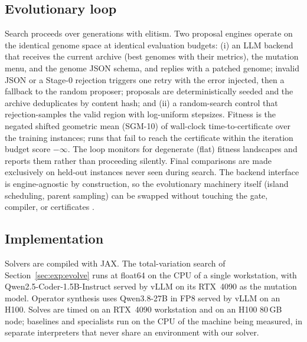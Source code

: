 \subsection{Evolutionary loop}

Search proceeds over generations with elitism. Two proposal engines operate
on the identical genome space at identical evaluation budgets: (i) an
LLM backend that receives the current archive (best genomes with their
metrics), the mutation menu, and the genome JSON schema, and replies with a
patched genome; invalid JSON or a Stage-0 rejection triggers one retry
with the error injected, then a fallback to the random proposer; proposals
are deterministically seeded and the archive deduplicates by content hash;
and (ii) a random-search control that rejection-samples the valid
region with log-uniform stepsizes. Fitness is the negated shifted geometric
mean (SGM-10) of wall-clock time-to-certificate over the training instances;
runs that fail to reach the certificate within the iteration budget score
$-\infty$. The loop monitors for degenerate (flat) fitness landscapes and
reports them rather than proceeding silently. Final comparisons are made
exclusively on held-out instances never seen during search. The backend
interface is engine-agnostic by construction, so the evolutionary machinery
itself (island scheduling, parent sampling) can be swapped without touching
the gate, compiler, or certificates \citep{Liu2026SkyDiscover}.


\subsection{Implementation}

Solvers are compiled with JAX. The total-variation search of
Section~\ref{sec:exp:evolve} runs at float64 on the CPU of a single
workstation, with Qwen2.5-Coder-1.5B-Instruct served by vLLM on its RTX~4090 as
the mutation model. Operator synthesis uses Qwen3.8-27B in FP8 served by vLLM
on an H100. Solves are timed on an RTX~4090 workstation and on an H100 80\,GB
node; baselines and specialists run on the CPU of the machine being measured,
in separate interpreters that never share an environment with our solver.

